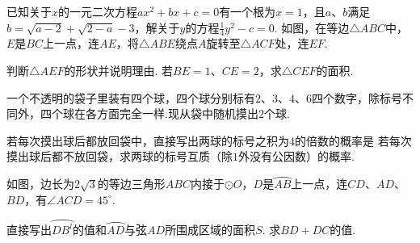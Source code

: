 \documentclass[10pt]{article}
\begin{document}
\begin{questions}{\answeringintroduction}
    \question 已知关于$x$的一元二次方程$ax^2+bx+c=0$有一个根为$x=1$，且$a$、$b$满足$b=\sqrt{a-2}+\sqrt{2-a}-3$，解关于$y$的方程$\frac{1}{4}y^2-c=0$.
    \addemptyline\addemptyline
    \question 如图，在等边$\triangle ABC$中，$E$是$BC$上一点，连$AE$，将$\triangle ABE$绕点$A$旋转至$\triangle ACF$处，连$EF$.
    \begin{subquestions}
        \subquestion 判断$\triangle AEF$的形状并说明理由.
        \subquestion 若$BE=1$、$CE=2$，求$\triangle CEF$的面积.
    \end{subquestions}
    \begin{figure}[!htb]
        \raggedleft
    \end{figure}
    \question 一个不透明的袋子里装有四个球，四个球分别标有$2$、$3$、$4$、$6$四个数字，除标号不同外，四个球在各方面完全一样.现从袋中随机摸出$2$个球.
    \begin{subquestions}
        \subquestion 若每次摸出球后都放回袋中，直接写出两球的标号之积为$4$的倍数的概率是\complitingline
        \subquestion 若每次摸出球后都不放回袋，求两球的标号互质（除$1$外没有公因数）的概率.
    \end{subquestions}
    \newpage
    \question 如图，边长为$2\sqrt{3}$的等边三角形$ABC$内接于$\odot O$，$D$是$\wideparen{AB}$上一点，连$CD$、$AD$、$BD$，有$\angle ACD=45^{\circ}$.
    \begin{subquestions}
        \subquestion 直接写出$\wideparen{{DB}^{l}}$的值和$\wideparen{AD}$与弦$AD$所围成区域的面积$S$.
        \subquestion 求$BD+DC$的值.
    \end{subquestions}
    \begin{figure}[!htb]
        \raggedleft
\end{figure}
\end{questions}
\end{document}
